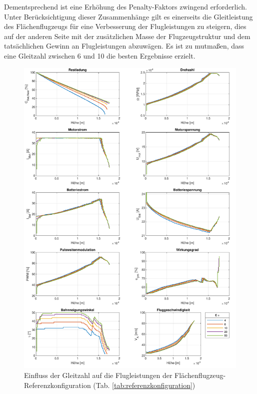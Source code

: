 Dementsprechend ist eine Erhöhung des Penalty-Faktors zwingend erforderlich. Unter Berücksichtigung dieser Zusammenhänge gilt es einerseits die Gleitleistung des Flächenflugzeugs für eine Verbesserung der Flugleistungen zu steigern, dies auf der anderen Seite mit der zusätzlichen Masse der Flugzeugstruktur und dem tatsächlichen Gewinn an Flugleistungen abzuwägen. Es ist zu mutmaßen, dass eine Gleitzahl zwischen 6 und 10 die besten Ergebnisse erzielt.

\begin{figure}[H]
\centering
	\includegraphics[scale=0.7]{Diagramme/Flaechenflzg_E.pdf}
	\caption{Einfluss der Gleitzahl auf die Flugleistungen der Flächenflugzeug-Referenzkonfiguration (Tab. \ref{tab:referenzkonfiguration})}
	\label{abb:gleitzahl}
\end{figure}



